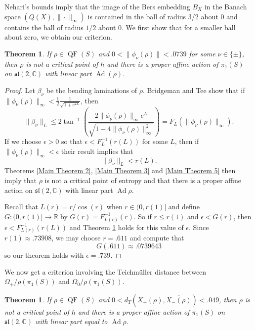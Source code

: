 \documentclass{amsart}
\theoremstyle{plain}
\newtheorem{theorem}[proposition]{Theorem}
\theoremstyle{definition}
\theoremstyle{remark}
\newcommand{\CC}{\mathbb C}
\newcommand{\R}{\mathbb R}
\newcommand{\Ad}{\operatorname{Ad}}
\newcommand{\QF}{\operatorname{QF}}
\newcommand{\<}{\left <}
\renewcommand{\>}{\right >}
\begin{document}
Nehari's bounds imply that the image of the Bers embedding $B_X$ in the Banach space $(Q(X), \|\cdot\|_\infty)$ is contained in the ball of 
radius 3/2 about $0$ and contains the ball of radius $1/2$ about $0$. We first show that for a smaller ball about zero, we obtain our criterion.

 \begin{theorem}
 \label{schwarzian bound}
If $\rho \in \QF(S)$ and $0 < \|\phi_\nu(\rho)\| < .0739$ for some $\nu \in \{\pm\}$, 
then $\rho$ is not a critical point of $h$ and 
there is a proper affine action of $\pi_1(S)$ on $\mathfrak{sl}(2,\CC)$ with linear part  $\Ad(\rho)$.
\end{theorem}

\begin{proof}
Let $\beta_\nu$ be the bending laminations of $\rho$.
Bridgeman and Tee \cite{BrTee} show that  if  $\|\phi_\nu(\rho)\|_\infty < \frac{1}{2}\frac{1}{\sqrt{1+e^{2L}}}$, then
$$ \|\beta_\nu\|_L \leq 2\tan^{-1}\left( \frac{2\|\phi_\nu(\rho)\|_\infty e^L}{\sqrt{1-4\|\phi_\nu(\rho)\|_\infty^2}}\right) = F_L(\|\phi_\nu(\rho)\|_\infty).$$
If  we choose $\epsilon>0$ so that $\epsilon < F_L^{-1}(r(L))$ for some $L$, then if $\|\phi_\nu(\rho)\|_\infty < \epsilon$ their result implies that
$$\|\beta_\nu\|_L < r(L).$$
Theorems \ref{Main Theorem 2}, \ref{Main Theorem 3}  and \ref{Main Theorem 5} then imply that $\rho$
is not a critical point of entropy and that there is a proper affine action on $\mathfrak{sl}(2,\CC)$ with linear part $\Ad\rho$. 

Recall that  $L(r) = r/\cos(r)$ when $r\in (0,r(1)]$ and define $G:(0,r(1)]\rightarrow \R$ by $G(r) = F_{L(r)}^{-1}(r)$. 
So if $r\le r(1)$ and  $\epsilon <  G(r)$, then $\epsilon < F_{L(r)}^{-1}(r(L))$ and Theorem \ref{schwarzian bound} holds for this value of $\epsilon$. 
Since  $r(1) \approx .73908$, we may choose $r = .611$ and compute that
$$G(.611) \approx .0739643$$
so our theorem holds with $\epsilon=.739$. 
\end{proof}


We now get a criterion involving the Teichm\"uller distance between $\Omega_+/\rho(\pi_1(S))$ and
$\Omega_0/\rho(\pi_1(S))$.

\begin{theorem}
\label{teich-thm}
 If $\rho \in \QF(S)$ and $0 < d_T\left(X_+(\rho),\overline{X_-(\rho)}\right) < .049$,
then $\rho$ is not a critical point of $h$ and 
there is a proper affine action of $\pi_1(S)$ on $\mathfrak{sl}(2,\CC)$ with linear part equal to $\Ad\rho$.
\end{theorem}
\end{document}
